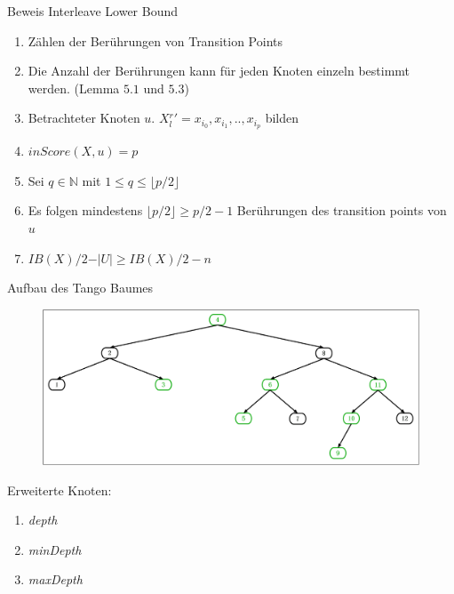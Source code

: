 \documentclass[11pt]{beamer}
\begin{document}
\begin{frame} {Beweis Interleave Lower Bound}
	\begin{enumerate}
		\item Zählen der Berührungen von Transition Points
		\item Die Anzahl der Berührungen kann für jeden Knoten einzeln bestimmt werden. (Lemma $5.1$ und $5.3$)
		\pause
		\item Betrachteter Knoten $u$. \mbox{$X{^r_l}' = x_{i_0},x_{i_1},..,x_{i_p}$} bilden
		\item $\mathit{inScore}\left(X, u\right) = p$
		\pause
		\item  Sei $q \in \mathbb{N}$ mit $1 \leq q \leq \lfloor p / 2 \rfloor$
		\pause
		\item  Es folgen mindestens $\lfloor p/2 \rfloor \geq p/2 - 1$ Berührungen des transition points von $u$
		\pause
		\item $\mathit{IB}\left(X\right) /2 - \vert U \vert \geq \mathit{IB}\left(X\right) /2 - n$
	\end{enumerate}
	
\end{frame}


\begin{frame} {Aufbau des Tango Baumes}
		\begin{figure}[H]
			\centering
			\includegraphics[width=1\textwidth]{"Medien/pres/tangoBaum"}
		\end{figure}
	Erweiterte Knoten:
	\begin{multicols}{3}
		\begin{enumerate}
			\item \textit{depth}
			\item \textit{minDepth}
			\item \textit{maxDepth}
		\end{enumerate}
	\end{multicols}
\end{frame}
\end{document}
